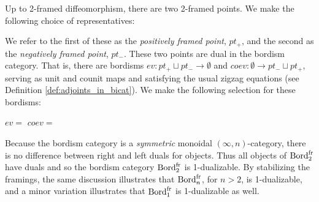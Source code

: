 \documentclass{amsart}
\begin{document}
Up to 2-framed diffeomorphism, there are two 2-framed points. We make the following choice of representatives:
\begin{center}
 \hspace{1.5cm}
\end{center}
We refer to the first of these as the {\em positively framed point}, $pt_+$, and the second as the {\em negatively framed point}, $pt_-$.  These two points are dual in the bordism category.  That is, there are bordisms $ev: pt_+ \sqcup pt_- \to \emptyset$ and $coev: \emptyset \to pt_- \sqcup pt_+$, serving as unit and counit maps and satisfying the usual zigzag equations (see Definition \ref{def:adjoints_in_bicat}). We make the following selection for these bordisms:
\begin{center}
	$ev =$
	\hspace{1.5cm}
	$coev =$ 
\end{center}
Because the bordism category is a {\em symmetric} monoidal $(\infty,n)$-category, there is no difference between right and left duals for objects.  Thus all objects of $\mathrm{Bord}^\mathrm{fr}_2$ have duals and so the bordism category $\mathrm{Bord}^\mathrm{fr}_2$ is 1-dualizable.  By stabilizing the framings, the same discussion illustrates that $\mathrm{Bord}^\mathrm{fr}_n$, for $n > 2$, is 1-dualizable, and a minor variation illustrates that $\mathrm{Bord}^\mathrm{fr}_1$ is 1-dualizable as well.
\end{document}
